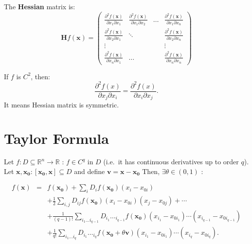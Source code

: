 \begin{definition}
    The \textbf{Hessian} matrix is:
    \[
        \mathbf{H}f(\mathbf{x}) = \begin{pmatrix}
            \frac{\partial ^{2}f(\mathbf{x})}{\partial x_1 \partial x_1} & \frac{\partial ^{2}f(\mathbf{x})}{\partial x_1 \partial x_2} & \dots & \frac{\partial ^{2}f(\mathbf{x})}{\partial x_1 \partial x_n} \\
            \frac{\partial ^{2}f(\mathbf{x})}{\partial x_2 \partial x_1} & \ddots                                                       &       & \frac{\partial ^{2}f(\mathbf{x})}{\partial x_2 \partial x_n} \\
            \vdots                                                       &                                                              &       & \vdots                                                       \\
            \frac{\partial ^{2}f(\mathbf{x})}{\partial x_n \partial x_1} & \dots                                                        &       & \frac{\partial ^{2}f(\mathbf{x})}{\partial x_n \partial x_n}
        \end{pmatrix}
    \]
\end{definition}

\begin{theorem}
    If \(f\) is \(C^{2}\), then:
    \[
        \frac{\partial^{2}f(x)}{\partial x_{j}\partial x_{i}} = \frac{\partial^{2}f(x)}{\partial x_{i}\partial x_{j}}.
    \]
    It means Hessian matrix is symmetric.
\end{theorem}

\section{Taylor Formula}

\begin{theorem}
    Let \(f:D\subseteq \mathbb{R}^{n}\to \mathbb{R}\) : \(f\in C^{q}\) in \(D\) (i.e.~it has continuous derivatives up to order \(q\)). Let \(\mathbf{x},\mathbf{x_0}:[\mathbf{x_0},\mathbf{x}]\subseteq D\) and define \(\mathbf{v} = \mathbf{x} - \mathbf{x_0}\) Then, \(\exists \theta \in (0,1)\) :

    \[
        \begin{array}{rcl}{f(\mathbf{x})}&{=}&{f(\mathbf{x_0})+\sum_iD_if(\mathbf{x_0})(x_i-x_{0i})}\\{}&{}&{+\frac{1}{2}\sum_{i,j}D_{ij}f(\mathbf{x_0})(x_i-x_{0i})(x_j-x_{0j})+\cdots}\\{}&{}&{+\frac{1}{(q-1)!}\sum_{i_1\dots i_{q-1}}D_{i_1}\dots_{i_{q-1}}f(\mathbf{x_0})(x_{i_1}-x_{0i_1})\cdots(x_{i_{q-1}}-x_{0i_{q-1}})}\\{}&{}&{+\frac{1}{q!}\sum_{i_1\dots i_q}D_{i_1}\dots_{i_q}f(\mathbf{x_0}+\theta\mathbf{v})(x_{i_1}-x_{0i_1})\cdots(x_{i_q}-x_{0i_q}).}\end{array}
    \]
\end{theorem}

